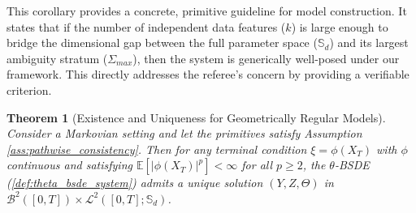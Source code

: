 \documentclass[12pt, letterpaper]{amsart}
\newcommand{\Bcal}{\mathcal{B}}
\newcommand{\Lcalp}[1]{\mathcal{L}^{#1}}
\newcommand{\Sd}{\mathbb{S}_d}
\theoremstyle{plain}
\newtheorem{theorem}{Theorem}[section]
\theoremstyle{definition}
\theoremstyle{remark}
\numberwithin{equation}{section} %
\begin{document}
This corollary provides a concrete, primitive guideline for model construction. It states that if the number of independent data features (\(k\)) is large enough to bridge the dimensional gap between the full parameter space (\(\Sd\)) and its largest ambiguity stratum (\(\Sigma_{max}\)), then the system is generically well-posed under our framework. This directly addresses the referee's concern by providing a verifiable criterion.

\begin{theorem}[Existence and Uniqueness for Geometrically Regular Models]
\label{thm:existence_geometric}
Consider a Markovian setting and let the primitives satisfy Assumption \ref{ass:pathwise_consistency}. Then for any terminal condition $\xi = \phi(X_T)$ with $\phi$ continuous and satisfying $\mathbb{E}[|\phi(X_T)|^p] < \infty$ for all $p \ge 2$, the $\theta$-BSDE (\cref{def:theta_bsde_system}) admits a unique solution $(Y,Z,\Theta)$ in $\Bcal^2([0,T]) \times \Lcalp{2}([0,T];\Sd)$.
\end{theorem}
\end{document}
